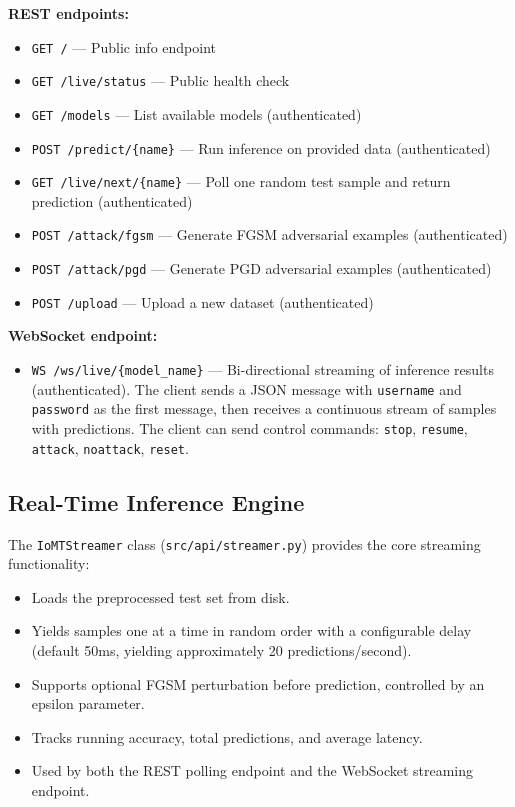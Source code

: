 \documentclass[12pt,a4paper,oneside]{report}
\begin{document}
\textbf{REST endpoints:}
\begin{itemize}
    \item \texttt{GET /} --- Public info endpoint
    \item \texttt{GET /live/status} --- Public health check
    \item \texttt{GET /models} --- List available models (authenticated)
    \item \texttt{POST /predict/\{name\}} --- Run inference on provided data (authenticated)
    \item \texttt{GET /live/next/\{name\}} --- Poll one random test sample and return prediction (authenticated)
    \item \texttt{POST /attack/fgsm} --- Generate FGSM adversarial examples (authenticated)
    \item \texttt{POST /attack/pgd} --- Generate PGD adversarial examples (authenticated)
    \item \texttt{POST /upload} --- Upload a new dataset (authenticated)
\end{itemize}

\textbf{WebSocket endpoint:}
\begin{itemize}
    \item \texttt{WS /ws/live/\{model\_name\}} --- Bi-directional streaming of inference results (authenticated). The client sends a JSON message with \texttt{username} and \texttt{password} as the first message, then receives a continuous stream of samples with predictions. The client can send control commands: \texttt{stop}, \texttt{resume}, \texttt{attack}, \texttt{noattack}, \texttt{reset}.
\end{itemize}

\subsection{Real-Time Inference Engine}

The \texttt{IoMTStreamer} class (\texttt{src/api/streamer.py}) provides the core streaming functionality:

\begin{itemize}
    \item Loads the preprocessed test set from disk.
    \item Yields samples one at a time in random order with a configurable delay (default 50ms, yielding approximately 20 predictions/second).
    \item Supports optional FGSM perturbation before prediction, controlled by an epsilon parameter.
    \item Tracks running accuracy, total predictions, and average latency.
    \item Used by both the REST polling endpoint and the WebSocket streaming endpoint.
\end{itemize}
\end{document}
